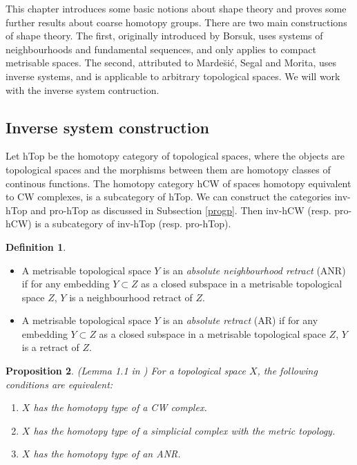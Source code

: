 \documentclass[a4paper,11pt]{article}
\theoremstyle{definition}
\newtheorem{definition}{Definition}[section]
\theoremstyle{plain}
\newtheorem{prop}[definition]{Proposition}
\theoremstyle{remark}
\begin{document}
{This chapter introduces some basic notions about shape theory and proves some further results about coarse homotopy groups. There are two main constructions of shape theory. The first, originally introduced by Borsuk, uses systems of neighbourhoods and fundamental sequences, and only applies to compact metrisable spaces. The second, attributed to Marde\u{s}i\'{c}, Segal and Morita,  uses inverse systems, and is applicable to arbitrary topological spaces. We will work with the inverse system contruction. 

\subsection{Inverse system construction}\label{inversesc}

 Let hTop be the homotopy category of topological spaces, where the objects are topological spaces and the morphisms between them are homotopy classes of continous functions. The homotopy category hCW of spaces homotopy equivalent to CW complexes, is a subcategory of hTop. We can construct the categories inv-hTop and pro-hTop as discussed in Subsection \ref{progp}. Then inv-hCW (resp. pro-hCW) is a subcategory of inv-hTop (resp. pro-hTop). 

\begin{definition} \begin{itemize}
\item A metrisable topological space $Y$ is an \textit{absolute neighbourhood retract} (ANR) if for any embedding $Y\subset Z$ as a closed subspace in a metrisable topological space $Z$, $Y$ is a neighbourhood retract of $Z$.
\item A metrisable topological space $Y$ is an \textit{absolute retract} (AR) if for any embedding $Y\subset Z$ as a closed subspace in a metrisable topological space $Z$, $Y$ is a retract of $Z$. 
\end{itemize}
\end{definition}

\begin{prop} (Lemma 1.1 in \cite{morita1975shapes}) For a topological space $X$, the following conditions are equivalent:
\begin{enumerate}
\item $X$ has the homotopy type of a CW complex. 
\item $X$ has the homotopy type of a simplicial complex with the metric topology.
\item $X$ has the homotopy type of an ANR. 
\end{enumerate}
\end{prop}

}
\end{document}
